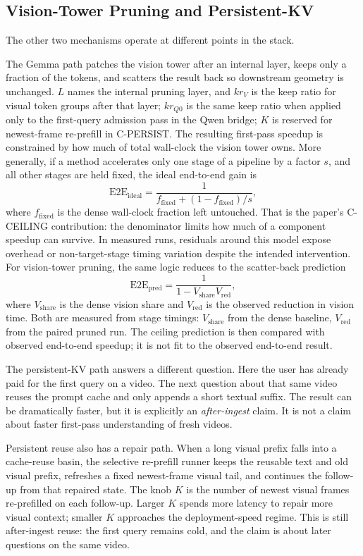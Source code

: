 \subsection{Vision-Tower Pruning and Persistent-KV}

The other two mechanisms operate at different points in the stack.

The Gemma path patches the vision tower after an internal layer, keeps only a
fraction of the tokens, and scatters the result back so downstream geometry is
unchanged. \(L\) names the internal pruning layer, and \(kr_V\) is the keep
ratio for visual token groups after that layer; \(kr_{Q0}\) is the same keep
ratio when applied only to the first-query admission pass in the Qwen bridge;
\(K\) is reserved for newest-frame re-prefill in C-PERSIST. The resulting first-pass
speedup is constrained by how much of total wall-clock the vision tower owns.
More generally, if a method accelerates only
one stage of a pipeline by a factor $s$, and all other stages are held fixed,
the ideal end-to-end gain is
\[
\mathrm{E2E}_{\mathrm{ideal}} =
\frac{1}{f_{\mathrm{fixed}} + (1 - f_{\mathrm{fixed}}) / s},
\]
where $f_{\mathrm{fixed}}$ is the dense wall-clock fraction left untouched.
That is the paper's C-CEILING contribution: the denominator limits how much of
a component speedup can survive. In measured runs, residuals around this model
expose overhead or non-target-stage timing variation despite the intended
intervention. For vision-tower pruning, the same logic
reduces to the scatter-back prediction
\[
\mathrm{E2E}_{\mathrm{pred}} =
\frac{1}{1 - V_{\mathrm{share}} V_{\mathrm{red}}},
\]
where $V_{\mathrm{share}}$ is the dense vision share and $V_{\mathrm{red}}$ is
the observed reduction in vision time. Both are measured from stage timings:
\(V_{\mathrm{share}}\) from the dense baseline, \(V_{\mathrm{red}}\) from the
paired pruned run. The ceiling prediction is then compared with observed
end-to-end speedup; it is not fit to the observed end-to-end result.

The persistent-KV path answers a different question. Here the user has already
paid for the first query on a video. The next question about that same video
reuses the prompt cache and only appends a short textual suffix. The result can
be dramatically faster, but it is explicitly an \emph{after-ingest} claim. It
is not a claim about faster first-pass understanding of fresh videos.

Persistent reuse also has a repair path. When a long visual prefix falls into a
cache-reuse basin, the selective re-prefill runner keeps the reusable text and
old visual prefix, refreshes a fixed newest-frame visual tail, and continues the
follow-up from that repaired state. The knob \(K\) is the number of newest
visual frames re-prefilled on each follow-up. Larger \(K\) spends more latency
to repair more visual context; smaller \(K\) approaches the deployment-speed
regime. This is still after-ingest reuse: the first query remains cold, and the
claim is about later questions on the same video.

